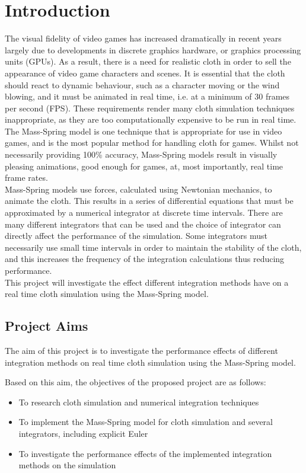 \chapter{Introduction}

The visual fidelity of video games has increased dramatically in recent years largely due to developments in discrete graphics hardware, or graphics processing units (GPUs). As a result, there is a need for realistic cloth in order to sell the appearance of video game characters and scenes. It is essential that the cloth should react to dynamic behaviour, such as a character moving or the wind blowing, and it must be animated in real time, i.e. at a minimum of 30 frames per second (FPS). These requirements render many cloth simulation techniques inappropriate, as they are too computationally expensive to be run in real time. The Mass-Spring model is one technique that is appropriate for use in video games, and is the most popular method for handling cloth for games. Whilst not necessarily providing 100\% accuracy, Mass-Spring models result in visually pleasing animations, good enough for games, at, most importantly, real time frame rates.
\\Mass-Spring models use forces, calculated using Newtonian mechanics, to animate the cloth. This results in a series of differential equations that must be approximated by a numerical integrator at discrete time intervals. There are many different integrators that can be used and the choice of integrator can directly affect the performance of the simulation. Some integrators must necessarily use small time intervals in order to maintain the stability of the cloth, and this increases the frequency of the integration calculations thus reducing performance.
\\This project will investigate the effect different integration methods have on a real time cloth simulation using the Mass-Spring model.

\section{Project Aims}
The aim of this project is to investigate the performance effects of different integration methods on real time cloth simulation using the Mass-Spring model.

Based on this aim, the objectives of the proposed project are as follows:
\begin{itemize}
\item {To research cloth simulation and numerical integration techniques }
\item {To implement the Mass-Spring model for cloth simulation and several integrators, including explicit Euler}
\item {To investigate the performance effects of the implemented integration methods on the simulation}
\end{itemize}

